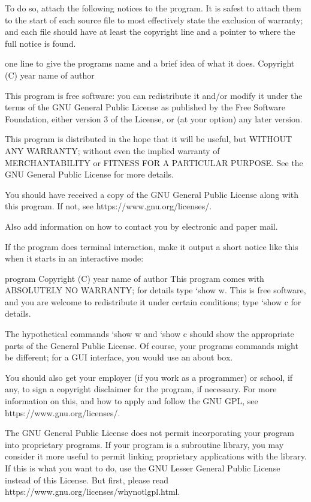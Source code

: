 \documentclass[letterpaper,10pt,english]{sphinxmanual}
\begin{document}
\begin{sphinxVerbatim}[commandchars=\\\{\}]
  To do so, attach the following notices to the program.  It is safest
to attach them to the start of each source file to most effectively
state the exclusion of warranty; and each file should have at least
the \PYGZdq{}copyright\PYGZdq{} line and a pointer to where the full notice is found.

    \PYGZlt{}one line to give the program\PYGZsq{}s name and a brief idea of what it does.\PYGZgt{}
    Copyright (C) \PYGZlt{}year\PYGZgt{}  \PYGZlt{}name of author\PYGZgt{}

    This program is free software: you can redistribute it and/or modify
    it under the terms of the GNU General Public License as published by
    the Free Software Foundation, either version 3 of the License, or
    (at your option) any later version.

    This program is distributed in the hope that it will be useful,
    but WITHOUT ANY WARRANTY; without even the implied warranty of
    MERCHANTABILITY or FITNESS FOR A PARTICULAR PURPOSE.  See the
    GNU General Public License for more details.

    You should have received a copy of the GNU General Public License
    along with this program.  If not, see \PYGZlt{}https://www.gnu.org/licenses/\PYGZgt{}.

Also add information on how to contact you by electronic and paper mail.

  If the program does terminal interaction, make it output a short
notice like this when it starts in an interactive mode:

    \PYGZlt{}program\PYGZgt{}  Copyright (C) \PYGZlt{}year\PYGZgt{}  \PYGZlt{}name of author\PYGZgt{}
    This program comes with ABSOLUTELY NO WARRANTY; for details type `show w\PYGZsq{}.
    This is free software, and you are welcome to redistribute it
    under certain conditions; type `show c\PYGZsq{} for details.

The hypothetical commands `show w\PYGZsq{} and `show c\PYGZsq{} should show the appropriate
parts of the General Public License.  Of course, your program\PYGZsq{}s commands
might be different; for a GUI interface, you would use an \PYGZdq{}about box\PYGZdq{}.

  You should also get your employer (if you work as a programmer) or school,
if any, to sign a \PYGZdq{}copyright disclaimer\PYGZdq{} for the program, if necessary.
For more information on this, and how to apply and follow the GNU GPL, see
\PYGZlt{}https://www.gnu.org/licenses/\PYGZgt{}.

  The GNU General Public License does not permit incorporating your program
into proprietary programs.  If your program is a subroutine library, you
may consider it more useful to permit linking proprietary applications with
the library.  If this is what you want to do, use the GNU Lesser General
Public License instead of this License.  But first, please read
\PYGZlt{}https://www.gnu.org/licenses/why\PYGZhy{}not\PYGZhy{}lgpl.html\PYGZgt{}.
\end{sphinxVerbatim}
\end{document}

